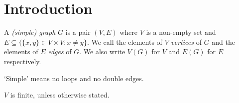\section{Introduction}

\begin{definition}
    A \emph{(simple) graph} $G$ is a pair $(V, E)$ where $V$ is a non-empty set and $E \subseteq \{\{x,y\} \in V \times V: x \neq y\}$. We call the elements of $V$ \emph{vertices} of $G$ and the elements of $E$ \emph{edges} of $G$. We also write $V(G)$ for $V$ and $E(G)$ for $E$ respectively.
    
    \lq Simple\rq{} means no loops and no double edges.
\end{definition}

\begin{remark}
    $V$ is finite, unless otherwise stated.
\end{remark}

